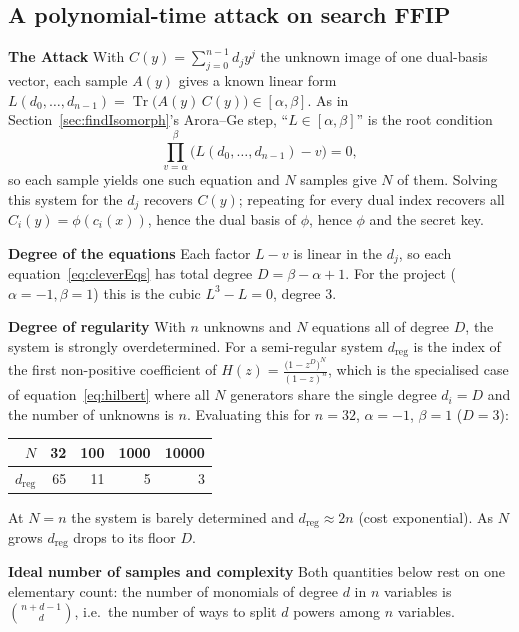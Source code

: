 \documentclass{article}
\DeclareMathOperator{\Tr}{Tr}
\begin{document}
\subsection{A polynomial-time attack on search FFIP}
\label{sec:cleverattack}
\textbf{The Attack}
With $C(y)=\sum_{j=0}^{n-1} d_j y^{j}$ the unknown image of one dual-basis vector, each sample $A(y)$ gives a known linear form $L(d_0,\dots,d_{n-1})=\Tr\bigl(A(y)\,C(y)\bigr) \in [\alpha,\beta]$. As in Section~\ref{sec:findIsomorph}'s Arora--Ge step, ``$L\in[\alpha,\beta]$'' is the root condition
\begin{equation}
    \prod_{v=\alpha}^{\beta}\bigl(L(d_0,\dots,d_{n-1})-v\bigr)=0 ,
    \label{eq:cleverEqs}
\end{equation}
so each sample yields one such equation and $N$ samples give $N$ of them. Solving this system for the $d_j$ recovers $C(y)$; repeating for every dual index recovers all $C_i(y)=\phi(c_i(x))$, hence the dual basis of $\phi$, hence $\phi$ and the secret key.

\textbf{Degree of the equations}
Each factor $L-v$ is linear in the $d_j$, so each equation~\eqref{eq:cleverEqs} has total degree $D=\beta-\alpha+1$. For the project ($\alpha=-1,\beta=1$) this is the cubic $L^{3}-L=0$, degree $3$.

\textbf{Degree of regularity}
With $n$ unknowns and $N$ equations all of degree $D$, the system is strongly overdetermined. For a semi-regular system $d_{\mathrm{reg}}$ is the index of the first non-positive coefficient of $H(z)=\frac{\bigl(1-z^{D}\bigr)^{N}}{(1-z)^{n}}$, which is the specialised case of equation~\eqref{eq:hilbert} where all $N$ generators share the single degree $d_i=D$ and the number of unknowns is $n$. Evaluating this for $n=32$, $\alpha=-1$, $\beta=1$ ($D=3$):
\begin{center}
\begin{tabular}{r|r|r|r|r}
\hline
$N$ & 32 & 100 & 1000 & 10000 \\
\hline
$d_{\mathrm{reg}}$ & 65 & 11 & 5 & 3 \\
\hline
\end{tabular}
\end{center}
At $N=n$ the system is barely determined and $d_{\mathrm{reg}}\approx 2n$ (cost exponential). As $N$ grows $d_{\mathrm{reg}}$ drops to its floor $D$.

\textbf{Ideal number of samples and complexity}
Both quantities below rest on one elementary count: the number of monomials of degree $d$ in $n$ variables is $\binom{n+d-1}{d}$, i.e.\ the number of ways to split $d$ powers among $n$ variables.
\end{document}
